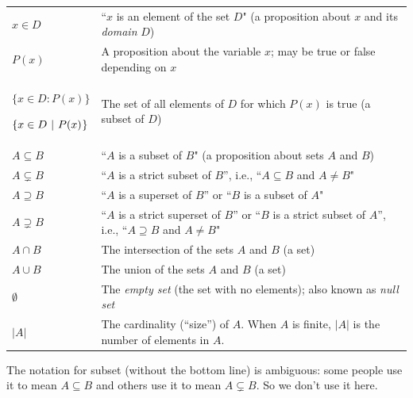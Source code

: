 \documentclass[11pt]{article}
\newcommand\st{:}
\theoremstyle{definition}
\begin{document}
\vspace*{8pt}
\begin{tabular}{L{1in}L{5in}}
$x\in D$ & ``$x$ is an element of the set $D$"  (a proposition about $x$ and its {\it domain} $D$)\\

$P(x)$ & A proposition about the variable $x$; may be true or false depending on $x$ \\

$\{x \in D\st P(x)\}$ 

$\{x\in D \hspace*{3.5pt}|\hspace*{3.5pt} P(x)\hspace*{.5pt}\}$ & The set of all elements of $D$ for which $P(x)$ is true (a subset of $D$)\\ 

$A \subseteq B$ & ``$A$ is a subset of $B$"  (a proposition about sets $A$ and $B$)\\

$A \subsetneq B$ & ``$A$ is a strict subset of $B$'', i.e., ``$A\subseteq B$ and $A \neq B$" \\
$A \supseteq B$ & ``$A$ is a superset of $B$'' or ``$B$ is a subset of $A$" \\

$A \supsetneq B$ &  ``$A$ is a strict superset of $B$'' or ``$B$ is a strict subset of $A$'',  i.e., ``$A\supseteq B$ and $A \neq B$"   \\ 


$A \cap B$ & The intersection of the sets $A$ and $B$  (a set)\\

$A \cup B$ & The union of the sets $A$ and $B$  (a set)\\

$\emptyset$ & The {\it empty set} (the set with no elements); also known as {\it null set}\\
$|A|$ & The cardinality (``size'') of $A$. When $A$ is finite, $|A|$ is the number of elements in $A$.
\end{tabular}

\vspace*{8pt}

\begin{note} The notation for subset (without the bottom line) is ambiguous: some people use it to mean $A \subseteq B$ and others use it to mean $A \subsetneq B$. So we don't use it here.
\end{note}
\end{document}
